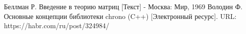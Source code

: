 %
%

\newpage
\begin{thebibliography}{}
      Беллман Р. Введение в теорию матриц [Текст] - Москва: Мир, 1969
      Володин Ф. Основные концепции библиотеки chrono (C++) [Электронный ресурс]. URL: https://habr.com/ru/post/324984/
\end{thebibliography}

